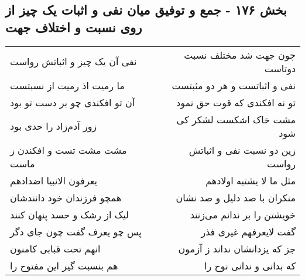 \begin{center}
\section*{بخش ۱۷۶ - جمع و توفیق میان نفی و اثبات یک چیز از روی نسبت و اختلاف جهت}
\label{sec:sh176}
\begin{longtable}{l p{0.5cm} r}
نفی آن یک چیز و اثباتش رواست
&&
چون جهت شد مختلف نسبت دوتاست
\\
ما رمیت اذ رمیت از نسبتست
&&
نفی و اثباتست و هر دو مثبتست
\\
آن تو افکندی چو بر دست تو بود
&&
تو نه افکندی که قوت حق نمود
\\
زور آدم‌زاد را حدی بود
&&
مشت خاک اشکست لشکر کی شود
\\
مشت مشت تست و افکندن ز ماست
&&
زین دو نسبت نفی و اثباتش رواست
\\
یعرفون الانبیا اضدادهم
&&
مثل ما لا یشتبه اولادهم
\\
همچو فرزندان خود دانندشان
&&
منکران با صد دلیل و صد نشان
\\
لیک از رشک و حسد پنهان کنند
&&
خویشتن را بر ندانم می‌زنند
\\
پس چو یعرف گفت چون جای دگر
&&
گفت لایعرفهم غیری فذر
\\
انهم تحت قبابی کامنون
&&
جز که یزدانشان نداند ز آزمون
\\
هم بنسبت گیر این مفتوح را
&&
که بدانی و ندانی نوح را
\\
\end{longtable}
\end{center}
